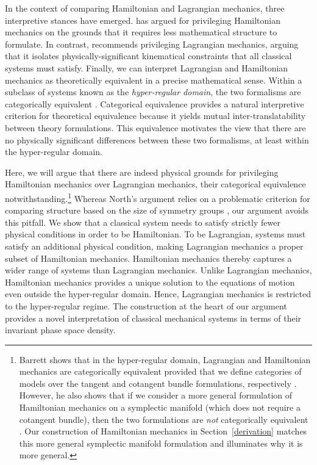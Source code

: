 \documentclass[12pt, twoside]{article}
\begin{document}
In the context of comparing Hamiltonian and Lagrangian mechanics, three interpretive stances have emerged. \textcites[]{North} has argued for privileging Hamiltonian mechanics on the grounds that it requires less mathematical structure to formulate. In contrast, \textcites[]{Curiel} recommends privileging Lagrangian mechanics, arguing that it isolates physically-significant kinematical constraints that all classical systems must satisfy. Finally, we can interpret Lagrangian and Hamiltonian mechanics as theoretically equivalent in a precise mathematical sense. Within a subclass of systems known as the \textit{hyper-regular domain}, the two formalisms are categorically equivalent \parencites[]{Teh}{Barrett2}. Categorical equivalence provides a natural interpretive criterion for theoretical equivalence because it yields mutual inter-translatability between theory formulations. This equivalence motivates the view that there are no physically significant differences between these two formalisms, at least within the hyper-regular domain. 

Here, we will argue that there are indeed physical grounds for privileging Hamiltonian mechanics over Lagrangian mechanics, their categorical equivalence notwithstanding.\footnote{Barrett shows that in the hyper-regular domain, Lagrangian and Hamiltonian mechanics are categorically equivalent provided that we define categories of models over the tangent and cotangent bundle formulations, respectively \parencites*[1181-82]{Barrett2}. However, he also shows that if we consider a more general formulation of Hamiltonian mechanics on a symplectic manifold (which does not require a cotangent bundle), then the two formulations are \textit{not} categorically equivalent \parencites*[1182-83]{Barrett2}. Our construction of Hamiltonian mechanics in Section~\ref{derivation} matches this more general symplectic manifold formulation {\color{green} and illuminates why it is more general.}} Whereas North's argument relies on a problematic criterion for comparing structure based on the size of symmetry groups \parencites[]{Swanson}, our argument avoids this pitfall. We show that a classical system needs to satisfy strictly fewer physical conditions in order to be Hamiltonian. To be Lagrangian, systems must satisfy an additional physical condition, making Lagrangian mechanics a proper subset of Hamiltonian mechanics. Hamiltonian mechanics thereby captures a wider range of systems than Lagrangian mechanics. {\color{green} Unlike Lagrangian mechanics, Hamiltonian mechanics provides a unique solution to the equations of motion even outside the hyper-regular domain. Hence, Lagrangian mechanics is restricted to the hyper-regular regime.} The construction at the heart of our argument provides a novel interpretation of classical mechanical systems in terms of their invariant phase space density. 
\end{document}
